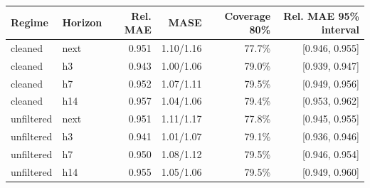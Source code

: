 \begin{tabular}{@{}llrrrr@{}}\toprule
Regime & Horizon & Rel. MAE & MASE & Coverage 80\% & Rel. MAE 95\% interval\\\midrule
cleaned & next & 0.951 & 1.10/1.16 & 77.7\% & [0.946, 0.955] \\
cleaned & h3 & 0.943 & 1.00/1.06 & 79.0\% & [0.939, 0.947] \\
cleaned & h7 & 0.952 & 1.07/1.11 & 79.5\% & [0.949, 0.956] \\
cleaned & h14 & 0.957 & 1.04/1.06 & 79.4\% & [0.953, 0.962] \\
unfiltered & next & 0.951 & 1.11/1.17 & 77.8\% & [0.945, 0.955] \\
unfiltered & h3 & 0.941 & 1.01/1.07 & 79.1\% & [0.936, 0.946] \\
unfiltered & h7 & 0.950 & 1.08/1.12 & 79.5\% & [0.946, 0.954] \\
unfiltered & h14 & 0.955 & 1.05/1.06 & 79.5\% & [0.949, 0.960] \\
\bottomrule\end{tabular}
